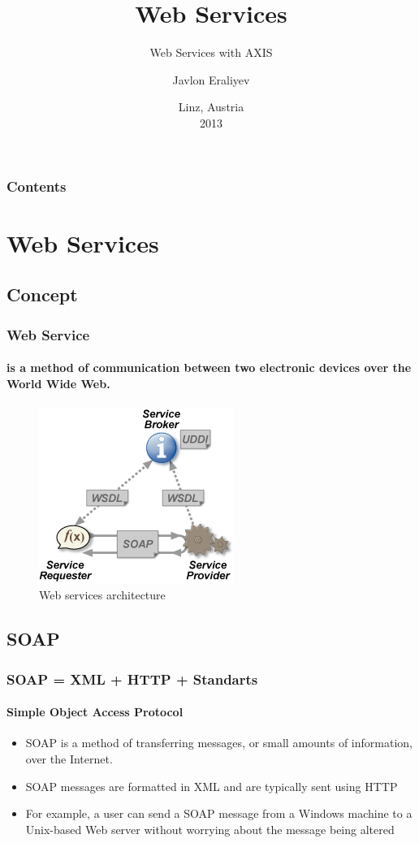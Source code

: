 \documentclass{beamer}
\title{Web Services}
\subtitle{Web Services with AXIS}
\author{Javlon Eraliyev}
\date{Linz, Austria\\2013}
\begin{document}
\begin{frame}
\titlepage
\end{frame}

\begin{frame}
\frametitle{Contents}
\tableofcontents
\end{frame}

\section{Web Services}

\subsection[Short First Subsection Name]{Concept }

\begin{frame}
\frametitle{Web Service}
\framesubtitle{is a method of communication between two electronic devices over the World Wide Web.}

\begin{figure}
\centering
\includegraphics[scale=0.7]{../pics/Webservices.png}
\caption{Web services architecture}
\label{overflow}
\end{figure}
 
\end{frame}


\subsection[Short First Subsection Name]{SOAP} 

\begin{frame}
\frametitle{SOAP = XML + HTTP + Standarts}
\framesubtitle{Simple Object Access Protocol}
\begin{itemize}
  \item SOAP is a method of transferring messages, or small amounts of information, over the Internet.
  \item SOAP messages are formatted in XML and are typically sent using HTTP  
  \item For example, a user can send a SOAP message from a Windows machine to a Unix-based Web server without worrying about the message being altered
\end{itemize}
\end{frame}
\end{document}
